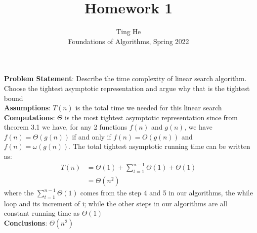 \documentclass[12pt]{article}
\newenvironment{proposition}[2][Proposition]{\begin{trivlist}
\item[\hskip \labelsep {\bfseries #1}\hskip \labelsep {\bfseries #2.}]}{\end{trivlist}}
\begin{document}
 
 
 
\title{Homework 1}%
\author{Ting He\\ %
Foundations of Algorithms, Spring 2022} %
 
\maketitle
 
\begin{proposition}{1} 
\end{proposition}
\setlength{\parindent}{0pt}
\textbf{Problem Statement}: Describe the time complexity of linear search algorithm. Choose the tightest asymptotic representation and argue why that is the tightest bound \\
\textbf{Assumptions}: $T(n)$ is the total time we needed for this linear search \\
\textbf{Computations}: $\Theta$ is the most tightest asymptotic representation since from theorem 3.1 we have, for any 2 functions $f(n)$ and $g(n)$, we have $f(n) = \Theta(g(n))$ if and only if $f(n) = O(g(n))$ and $f(n) = \omega(g(n))$. The total tightest asymptotic running time can be written as:
\begin{align*}
    T(n) &= \Theta(1) + \sum_{t=1}^{n-1}\Theta(1)+\Theta(1) \\
              &= \Theta(n^2)
\end{align*}
where the $\sum_{t=1}^{n-1}\Theta(1)$ comes from the step 4 and 5 in our algorithms, the while loop and its increment of i; while the other steps in our algorithms are all constant running time as $\Theta(1)$ \\
\textbf{Conclusions}: $\Theta(n^2)$
\end{document}
